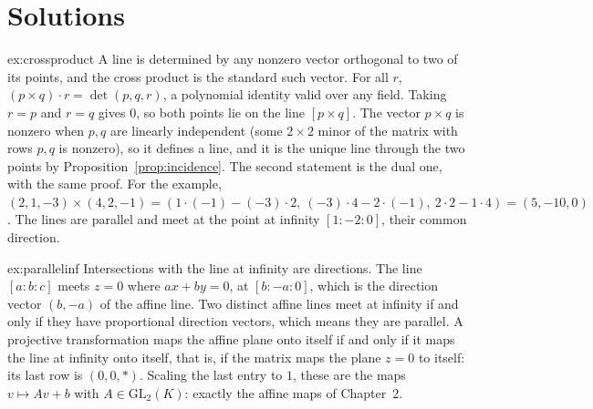 \section{Solutions}

\begin{solution}{ex:crossproduct}
\idea A line is determined by any nonzero vector orthogonal to two of its points, and the cross product is the standard such vector.
\writeup For all $r$, $(p\times q)\cdot r=\det(p,q,r)$, a polynomial identity valid over any field. Taking $r=p$ and $r=q$ gives $0$, so both
points lie on the line $[p\times q]$. The vector $p\times q$ is nonzero when $p,q$ are linearly independent (some $2\times2$ minor of the
matrix with rows $p,q$ is nonzero), so it defines a line, and it is the unique line through the two points by Proposition~\ref{prop:incidence}.
The second statement is the dual one, with the same proof. For the example, $(2,1,-3)\times(4,2,-1)=(1\cdot(-1)-(-3)\cdot2,\ (-3)\cdot4-2\cdot(-1),\
2\cdot2-1\cdot4)=(5,-10,0)$. The lines are parallel and meet at the point at infinity $[1:-2:0]$, their common direction.
\end{solution}

\begin{solution}{ex:parallelinf}
\idea Intersections with the line at infinity are directions.
\writeup The line $[a:b:c]$ meets $z=0$ where $ax+by=0$, at $[b:-a:0]$, which is the direction vector $(b,-a)$ of the affine line. Two distinct
affine lines meet at infinity if and only if they have proportional direction vectors, which means they are parallel. A projective
transformation maps the affine plane onto itself if and only if it maps the line at infinity onto itself, that is, if the matrix maps the plane
$z=0$ to itself: its last row is $(0,0,\ast)$. Scaling the last entry to $1$, these are the maps $v\mapsto Av+b$ with $A\in\mathrm{GL}_2(K)$:
exactly the affine maps of Chapter~2.
\end{solution}

